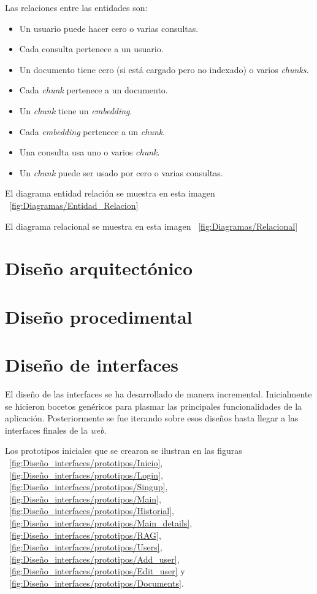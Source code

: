 Las relaciones entre las entidades son:
\begin{itemize}
\tightlist
	\item Un usuario puede hacer cero o varias consultas.
	\item Cada consulta pertenece a un usuario.
	\item Un documento tiene cero (si está cargado pero no indexado) o varios \textit{chunks}.
	\item Cada \textit{chunk} pertenece a un documento.
	\item Un \textit{chunk} tiene un \textit{embedding}.
	\item Cada \textit{embedding} pertenece a un \textit{chunk}.
	\item Una consulta usa uno o varios \textit{chunk}.
	\item Un \textit{chunk} puede ser usado por cero o varias consultas.
\end{itemize}

El diagrama entidad relación se muestra en esta imagen ~\ref{fig:Diagramas/Entidad_Relacion}

El diagrama relacional se muestra en esta imagen ~\ref{fig:Diagramas/Relacional}


\section{Diseño arquitectónico}

\section{Diseño procedimental}

\section{Diseño de interfaces}

El diseño de las interfaces se ha desarrollado de manera incremental. Inicialmente se hicieron bocetos genéricos para plasmar las principales funcionalidades de la aplicación. Posteriormente se fue iterando sobre esos diseños hasta llegar a las interfaces finales de la \textit{web}.

Los prototipos iniciales que se crearon se ilustran en las figuras ~\ref{fig:Diseño_interfaces/prototipos/Inicio}, ~\ref{fig:Diseño_interfaces/prototipos/Login}, ~\ref{fig:Diseño_interfaces/prototipos/Singup}, ~\ref{fig:Diseño_interfaces/prototipos/Main}, ~\ref{fig:Diseño_interfaces/prototipos/Historial}, ~\ref{fig:Diseño_interfaces/prototipos/Main_details}, ~\ref{fig:Diseño_interfaces/prototipos/RAG}, ~\ref{fig:Diseño_interfaces/prototipos/Users}, ~\ref{fig:Diseño_interfaces/prototipos/Add_user}, ~\ref{fig:Diseño_interfaces/prototipos/Edit_user} y ~\ref{fig:Diseño_interfaces/prototipos/Documents}.

